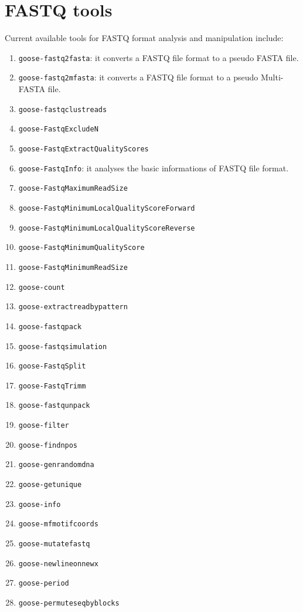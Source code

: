 \chapter{FASTQ tools}
\label{fastq}

Current available tools for FASTQ format analysis and manipulation include:
\begin{enumerate}

\item \texttt{goose-fastq2fasta}: it converts a FASTQ file format to a pseudo FASTA file.
\item \texttt{goose-fastq2mfasta}: it converts a FASTQ file format to a pseudo Multi-FASTA file.
\item \texttt{goose-fastqclustreads}
\item \texttt{goose-FastqExcludeN}
\item \texttt{goose-FastqExtractQualityScores}
\item \texttt{goose-FastqInfo}: it analyses the basic informations of FASTQ file format.
\item \texttt{goose-FastqMaximumReadSize}
\item \texttt{goose-FastqMinimumLocalQualityScoreForward}
\item \texttt{goose-FastqMinimumLocalQualityScoreReverse}
\item \texttt{goose-FastqMinimumQualityScore}
\item \texttt{goose-FastqMinimumReadSize}

\item \texttt{goose-count}
\item \texttt{goose-extractreadbypattern}

\item \texttt{goose-fastqpack}
\item \texttt{goose-fastqsimulation}
\item \texttt{goose-FastqSplit}
\item \texttt{goose-FastqTrimm}
\item \texttt{goose-fastqunpack}
\item \texttt{goose-filter}
\item \texttt{goose-findnpos}

\item \texttt{goose-genrandomdna}
\item \texttt{goose-getunique}
\item \texttt{goose-info}
\item \texttt{goose-mfmotifcoords}

\item \texttt{goose-mutatefastq}
\item \texttt{goose-newlineonnewx}
\item \texttt{goose-period}
\item \texttt{goose-permuteseqbyblocks}


\end{enumerate}
